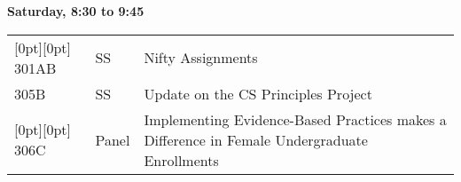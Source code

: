 









%
%
\noindent
{\sffamily\bfseries Saturday, 8:30 to 9:45}\newline\noindent
\begin{tabular*}{5in}{@{}p{0.5in}@{}p{0.75in}@{}p{3.75in}}

\rowcolor[gray]{0.9}[0pt][0pt] 301AB & SS & Nifty Assignments \\

305B & SS & Update on the CS Principles Project \\

\rowcolor[gray]{0.9}[0pt][0pt] 306C & Panel & Implementing Evidence-Based Practices makes a Difference in Female Undergraduate Enrollments \\
\end{tabular*}\newline

